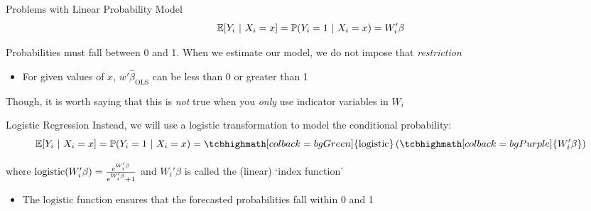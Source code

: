 \documentclass[aspectratio=169,t,11pt,table]{beamer}
\begin{document}
\begin{frame}{Problems with Linear Probability Model}
  \vspace*{-\bigskipamount}
  $$
    \expec{Y_i}{X_i = x} = \prob{Y_i = 1}{X_i = x} = W_i' \beta
  $$

  \bigskip
  Probabilities must fall between 0 and 1. When we estimate our model, we do not impose that \emph{restriction}
  \begin{itemize}
    \item For given values of $x$, $w' \hat{\beta}_{\text{OLS}}$ can be less than 0 or greater than 1
  \end{itemize}

  \bigskip
  Though, it is worth saying that this is \emph{not} true when you \emph{only} use indicator variables in $W_i$
\end{frame}

\begin{frame}{Logistic Regression}
  Instead, we will use a \alert{logistic transformation} to model the conditional probability:
  \bigskip
  $$
    \expec{Y_i}{X_i = x} = \prob{Y_i = 1}{X_i = x} = 
    \tcbhighmath[colback = bgGreen]{\textrm{logistic}} 
    \left(\tcbhighmath[colback = bgPurple]{W_i' \beta}\right)
  $$


  \smallskip
  where $\logistic{W_i'\beta} = \frac{e^{W_i'\beta}}{e^{W_i'\beta} + 1}$ and $W_i' \beta$ is called the (linear) `index function'

  \pause
  \begin{itemize}
    \item The $\textrm{logistic}$ function ensures that the forecasted probabilities fall within 0 and 1
  \end{itemize}
\end{frame}
\end{document}

